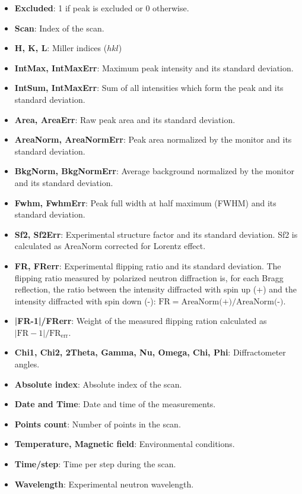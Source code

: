 \begin{itemize}
	\item \textbf{Excluded}: 1 if peak is excluded or 0 otherwise.
	\item \textbf{Scan}: Index of the scan.
	\item \textbf{H, K, L}: Miller indices ($hkl$)
	\item \textbf{IntMax, IntMaxErr}: Maximum peak intensity and its standard deviation.
	\item \textbf{IntSum, IntMaxErr}: Sum of all intensities which form the peak and its standard deviation.
	\item \textbf{Area, AreaErr}: Raw peak area and its standard deviation.
	\item \textbf{AreaNorm, AreaNormErr}: Peak area normalized by the monitor and its standard deviation.
	\item \textbf{BkgNorm, BkgNormErr}: Average background normalized by the monitor and its standard deviation.
	\item \textbf{Fwhm, FwhmErr}: Peak full width at half maximum (FWHM) and its standard deviation.
	\item \textbf{Sf2, Sf2Err}: Experimental structure factor and its standard deviation. Sf2 is calculated as AreaNorm corrected for Lorentz effect.
	\item \textbf{FR, FRerr}: Experimental flipping ratio and its standard deviation. The flipping ratio measured by polarized neutron diffraction is, for each Bragg reflection, the ratio between the intensity diffracted with spin up (+) and the intensity diffracted with spin down (-): $\text{FR} = \text{AreaNorm(+)}/\text{AreaNorm(-)}$.
	\item \textbf{|FR-1|/FRerr}: Weight of the measured flipping ration calculated as $|\text{FR}-1|/\text{FR}_\text{err}$.
	\item \textbf{Chi1, Chi2, 2Theta, Gamma, Nu, Omega, Chi, Phi}: Diffractometer angles.
	\item \textbf{Absolute index}: Absolute index of the scan.
	\item \textbf{Date and Time}: Date and time of the measurements.
	\item \textbf{Points count}: Number of points in the scan.
	\item \textbf{Temperature, Magnetic field}: Environmental conditions.
	\item \textbf{Time/step}: Time per step during the scan.
	\item \textbf{Wavelength}: Experimental neutron wavelength.
\end{itemize}

